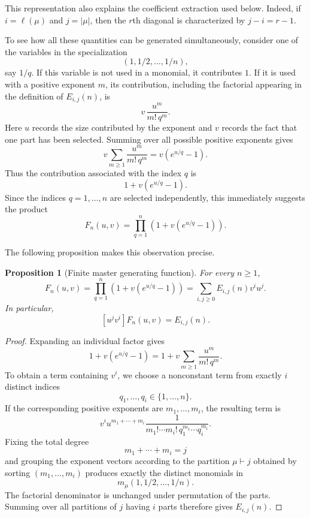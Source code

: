 \documentclass[11pt]{article}
\newtheorem{proposition}[theorem]{Proposition}
\theoremstyle{definition}
\begin{document}
This representation also explains the coefficient extraction used below.
Indeed, if $i=\ell(\mu)$ and $j=|\mu|$, then the $r$th diagonal is
characterized by $j-i=r-1$.


To see how all these quantities can be generated simultaneously,
consider one of the variables in the specialization
\[
        (1,1/2,\ldots,1/n),
\]
say $1/q$.  If this variable is not used in a monomial, it contributes
$1$.  If it is used with a positive exponent $m$, its contribution,
including the factorial appearing in the definition of $E_{i,j}(n)$,
is
\[
        v\,\frac{u^m}{m!\,q^m}.
\]
Here $u$ records the size contributed by the exponent and $v$ records
the fact that one part has been selected.  Summing over all possible
positive exponents gives
\[
        v\sum_{m\geq1}\frac{u^m}{m!\,q^m}
        =
        v(e^{u/q}-1).
\]
Thus the contribution associated with the index $q$ is
\[
        1+v(e^{u/q}-1).
\]
Since the indices $q=1,\ldots,n$ are selected independently, this
immediately suggests the product
\[
        F_n(u,v)
        =
        \prod_{q=1}^n
        \left(1+v(e^{u/q}-1)\right).
\]

The following proposition makes this observation precise.

\begin{proposition}[Finite master generating function]
\label{prop:F}
For every $n\geq1$,
\begin{equation}\label{eq:Fmaster}
 F_n(u,v)
 =
 \prod_{q=1}^n
 \left(1+v(e^{u/q}-1)\right)
 =
 \sum_{i,j\geq0}E_{i,j}(n)v^iu^j.
\end{equation}
In particular,
\[
        [u^jv^i]F_n(u,v)=E_{i,j}(n).
\]
\end{proposition}

\begin{proof}
Expanding an individual factor gives
\[
 1+v(e^{u/q}-1)
 =
 1+v\sum_{m\geq1}\frac{u^m}{m!\,q^m}.
\]
To obtain a term containing $v^i$, we choose a nonconstant term from
exactly $i$ distinct indices
\[
        q_1,\ldots,q_i\in\{1,\ldots,n\}.
\]
If the corresponding positive exponents are
$m_1,\ldots,m_i$, the resulting term is
\[
 v^i u^{m_1+\cdots+m_i}
 \frac{1}
 {m_1!\cdots m_i!\,
  q_1^{m_1}\cdots q_i^{m_i}}.
\]
Fixing the total degree
\[
        m_1+\cdots+m_i=j
\]
and grouping the exponent vectors according to the partition
$\mu\vdash j$ obtained by sorting $(m_1,\ldots,m_i)$ produces exactly
the distinct monomials in
\[
        m_\mu(1,1/2,\ldots,1/n).
\]
The factorial denominator is unchanged under permutation of the
parts.  Summing over all partitions of $j$ having $i$ parts therefore
gives $E_{i,j}(n)$.
\end{proof}
\end{document}
